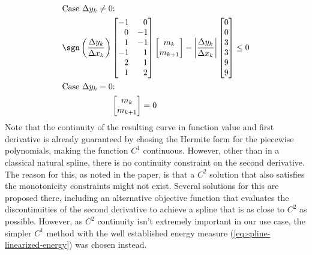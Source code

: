 \begin{align}
\intertext{Case $\Delta y_{k} \neq 0$:}
\sgn\left(\frac{\Delta y_k}{\Delta x_k}\right)
&\begin{bmatrix}
-1 & \ \ 0 \\
\ \ 0 & -1 \\
\ \ 1 & -1 \\
-1 & \ \ 1 \\
\ \ 2 & \ \ 1 \\
\ \ 1 & \ \ 2
\end{bmatrix}
\begin{bmatrix}
m_{k} \\
m_{k+1}
\end{bmatrix}
-
\bigg| \frac{\Delta y_k}{\Delta x_k} \bigg|
\begin{bmatrix}
0 \\
0 \\
3 \\
3 \\
9 \\
9
\end{bmatrix}
\le 0 \\
\intertext{Case $\Delta y_{k} = 0$:}
&\begin{bmatrix}
m_{k} \\m_{k+1}
\end{bmatrix}
= 0
\end{align}
%
Note that the continuity of the resulting curve in function value and first derivative is already guaranteed by chosing the Hermite form for the piecewise polynomials, making the function $C^1$ continuous.
However, other than in a classical natural spline, there is no continuity constraint on the second derivative.
The reason for this, as noted in the paper, is that a $C^2$ solution that also satisfies the monotonicity constraints might not exist.
Several solutions for this are proposed there, including an alternative objective function that evaluates the discontinuities of the second derivative to achieve a spline that is as close to $C^2$ as possible.
However, as $C^2$ continuity isn't extremely important in our use case, the simpler $C^1$ method with the well established energy measure (\ref{eq:spline-linearized-energy}) was chosen instead.